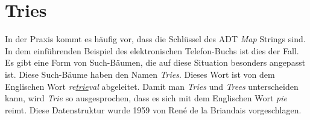\pagebreak


\section{Tries}
In der Praxis kommt es h\"aufig vor, dass die Schl\"ussel des ADT \textsl{Map} Strings sind.
In dem einf\"uhrenden Beispiel des elektronischen Telefon-Buchs ist dies der Fall.  Es gibt eine
Form von Such-B\"aumen, die auf diese Situation besonders angepasst ist.  Diese Such-B\"aume
haben den Namen \emph{Tries}.  Dieses Wort ist von dem Englischen Wort
\emph{re\underline{trie}val} abgeleitet. Damit man \emph{Tries} und \emph{Trees}
unterscheiden kann, wird \emph{Trie} so ausgesprochen, dass es sich mit dem Englischen
Wort \emph{pie} reimt.  Diese Datenstruktur wurde 1959 von Ren\'e de la Briandais
\cite{briandais:59} vorgeschlagen.


